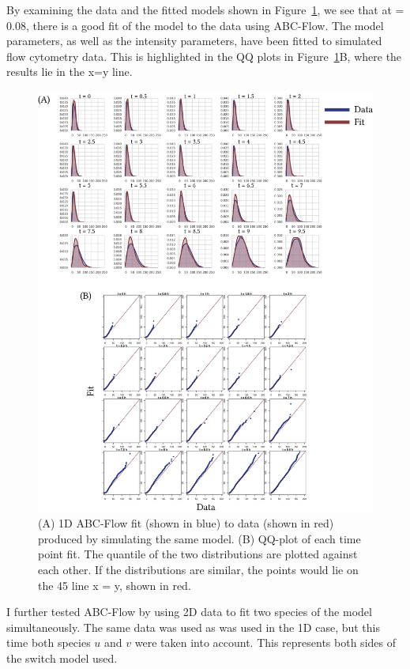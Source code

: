 By examining the data and the fitted models shown in Figure~\ref{fig:1d-sim-res}, we see that at \textepsilon = 0.08, there is a good fit of the model to the data using ABC-Flow. The model parameters, as well as the intensity parameters, have been fitted to simulated flow cytometry data. This is highlighted in the QQ plots in Figure~\ref{fig:1d-sim-res}B, where the results lie in the x=y line. 

\begin{figure}[htbp]
\centering
	\includegraphics[scale=0.9]{../../chapters/chapterABCFlow/images/1D_sim_res.png}
	\caption[Applying ABC-Flow to 1D simulated data]{\label{fig:1d-sim-res} (A) 1D ABC-Flow fit (shown in blue) to data (shown in red) produced by simulating the same model. (B) QQ-plot of each time point fit. The quantile of the two distributions are plotted against each other. If the distributions are similar, the points would lie on the 45\textdegree{} line x = y, shown in red. }
\end{figure}

I further tested ABC-Flow by using 2D data to fit two species of the model simultaneously. The same data was used as was used in the 1D case, but this time both species $u$ and $v$ were taken into account. This represents both sides of the switch model used. 


